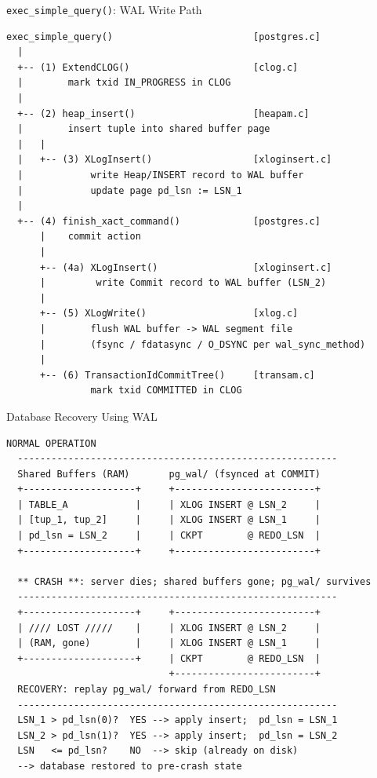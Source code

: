 \documentclass[aspectratio=169,10pt]{beamer}
\begin{document}
\begin{frame}[fragile]{\texttt{exec\_simple\_query()}: WAL Write Path}

\begin{lstlisting}[style=ascii]
exec_simple_query()                         [postgres.c]
  |
  +-- (1) ExtendCLOG()                      [clog.c]
  |        mark txid IN_PROGRESS in CLOG
  |
  +-- (2) heap_insert()                     [heapam.c]
  |        insert tuple into shared buffer page
  |   |
  |   +-- (3) XLogInsert()                  [xloginsert.c]
  |            write Heap/INSERT record to WAL buffer
  |            update page pd_lsn := LSN_1
  |
  +-- (4) finish_xact_command()             [postgres.c]
      |    commit action
      |
      +-- (4a) XLogInsert()                 [xloginsert.c]
      |         write Commit record to WAL buffer (LSN_2)
      |
      +-- (5) XLogWrite()                   [xlog.c]
      |        flush WAL buffer -> WAL segment file
      |        (fsync / fdatasync / O_DSYNC per wal_sync_method)
      |
      +-- (6) TransactionIdCommitTree()     [transam.c]
               mark txid COMMITTED in CLOG
\end{lstlisting}

\end{frame}

\begin{frame}[fragile]{Database Recovery Using WAL}
\begin{lstlisting}[style=ascii]
  NORMAL OPERATION
  ---------------------------------------------------------
  Shared Buffers (RAM)       pg_wal/ (fsynced at COMMIT)
  +--------------------+     +-------------------------+
  | TABLE_A            |     | XLOG INSERT @ LSN_2     |
  | [tup_1, tup_2]     |     | XLOG INSERT @ LSN_1     |
  | pd_lsn = LSN_2     |     | CKPT        @ REDO_LSN  |
  +--------------------+     +-------------------------+

  ** CRASH **: server dies; shared buffers gone; pg_wal/ survives
  ---------------------------------------------------------
  +--------------------+     +-------------------------+
  | //// LOST /////    |     | XLOG INSERT @ LSN_2     |
  | (RAM, gone)        |     | XLOG INSERT @ LSN_1     |
  +--------------------+     | CKPT        @ REDO_LSN  |
                             +-------------------------+
  RECOVERY: replay pg_wal/ forward from REDO_LSN
  ---------------------------------------------------------
  LSN_1 > pd_lsn(0)?  YES --> apply insert;  pd_lsn = LSN_1
  LSN_2 > pd_lsn(1)?  YES --> apply insert;  pd_lsn = LSN_2
  LSN   <= pd_lsn?    NO  --> skip (already on disk)
  --> database restored to pre-crash state
\end{lstlisting}
\end{frame}
\end{document}
